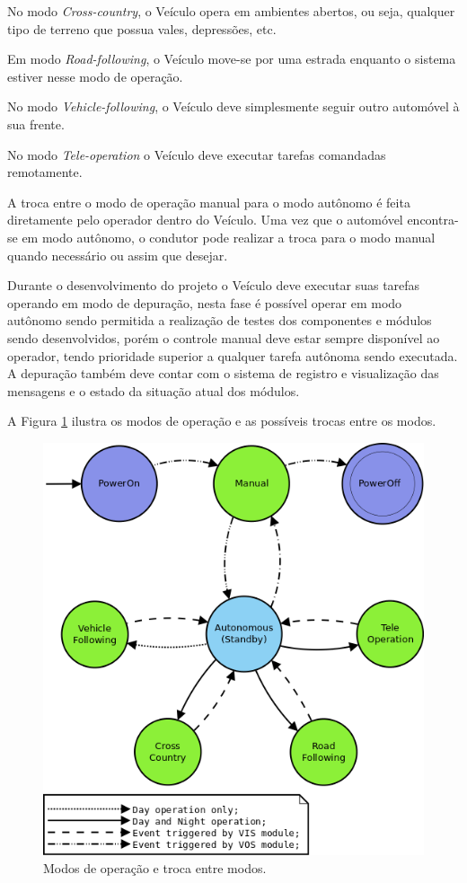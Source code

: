 \documentclass[conference]{IEEEtran}
\begin{document}
No modo \textit{Cross-country}, o Veículo opera em ambientes abertos, ou seja, qualquer tipo de terreno que possua vales, depressões, etc.

Em modo \textit{Road-following}, o Veículo move-se por uma estrada enquanto o sistema estiver nesse modo de operação.

No modo \textit{Vehicle-following}, o Veículo deve simplesmente seguir outro automóvel à sua frente. 

No modo \textit{Tele-operation} o Veículo deve executar tarefas comandadas remotamente.

A troca entre o modo de operação manual para o modo autônomo é feita diretamente pelo operador dentro do Veículo. Uma vez que o automóvel encontra-se em modo autônomo, o condutor pode realizar a troca para o modo manual quando necessário ou assim que desejar.

Durante o desenvolvimento do projeto o Veículo deve executar suas tarefas operando em modo de depuração, nesta fase é possível operar em modo autônomo sendo permitida a realização de testes dos componentes e módulos sendo desenvolvidos, porém o controle manual deve estar sempre disponível ao operador, tendo prioridade superior a qualquer tarefa autônoma sendo executada. A depuração também deve contar com o sistema de registro e visualização das mensagens e o estado da situação atual dos módulos.

A Figura \ref{fig:modos_operacao} ilustra os modos de operação e as possíveis trocas entre os modos.

\begin{figure}[!ht]
	\centering
	\includegraphics[scale=0.32]{files/VILMA_OPERATIONAL_MODE.png}
	\caption{Modos de operação e troca entre modos.}
	\label{fig:modos_operacao}
\end{figure}
\end{document}
